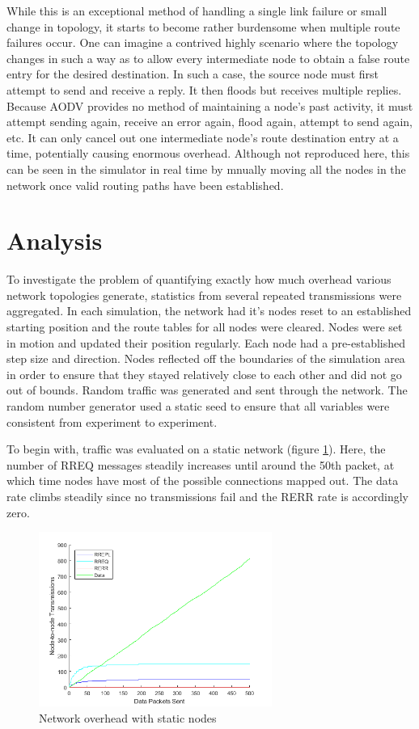 \documentclass[conference]{IEEEtran}
\begin{document}
While this is an exceptional method of handling a single link failure or small change in topology, it starts to become rather burdensome when multiple route failures occur. One can imagine a contrived highly scenario where the topology changes in such a way as to allow every intermediate node to obtain a false route entry for the desired destination. In such a case, the source node must first attempt to send and receive a reply. It then floods but receives multiple replies. Because AODV provides no method of maintaining a node's past activity, it must attempt sending again, receive an error again, flood again, attempt to send again, etc. It can only cancel out one intermediate node's route destination entry at a time, potentially causing enormous overhead. Although not reproduced here, this can be seen in the simulator in real time by mnually moving all the nodes in the network once valid routing paths have been established.

\section{Analysis}
\label{sect:analysis}

To investigate the problem of quantifying exactly how much overhead various network topologies generate, statistics from several repeated transmissions were aggregated. In each simulation, the network had it's nodes reset to an established starting position and the route tables for all nodes were cleared. Nodes were set in motion and updated their position regularly. Each node had a pre-established step size and direction. Nodes reflected off the boundaries of the simulation area in order to ensure that they stayed relatively close to each other and did not go out of bounds. Random traffic was generated and sent through the network. The random number generator used a static seed to ensure that all variables were consistent from experiment to experiment. 

To begin with, traffic was evaluated on a static network (figure \ref{fig:movement_none}). Here, the number of RREQ messages steadily increases until around the 50th packet, at which time nodes have most of the possible connections mapped out. The data rate climbs steadily since no transmissions fail and the RERR rate is accordingly zero.

\begin{figure}[h]
	\centering
	\includegraphics[width=3in]{movement_none.png}
	\caption{Network overhead with static nodes}
	\label{fig:movement_none}
\end{figure}
\end{document}
